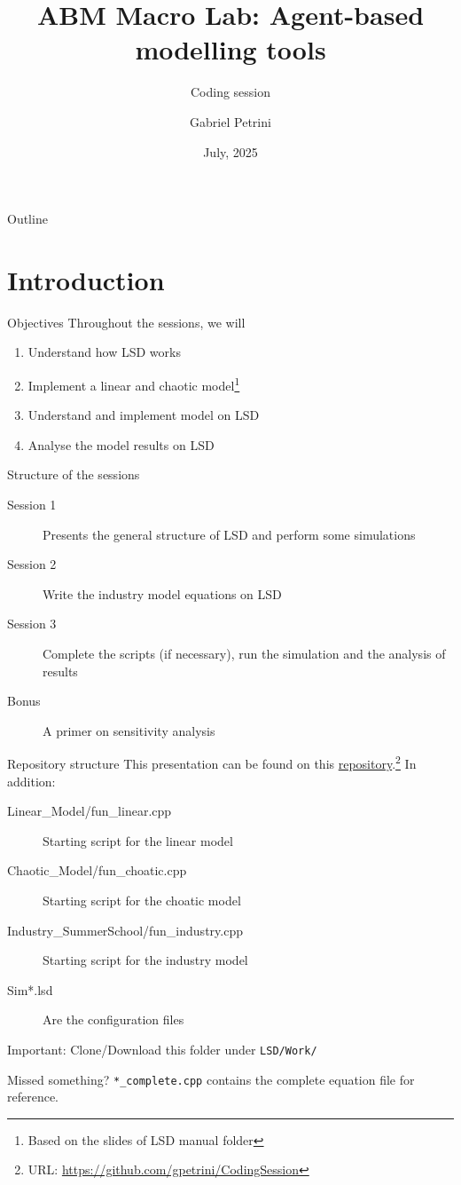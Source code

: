 \documentclass[bigger,aspectratio=169]{beamer}
\author{Gabriel Petrini}
\date{July, 2025}
\title{ABM Macro Lab: Agent-based modelling tools}
\subtitle{Coding session}
\begin{document}
\maketitle
\begin{frame}{Outline}
\tableofcontents
\end{frame}

\section{Introduction}
\label{sec:org9fabd29}

\begin{frame}[label={sec:org4c89f42}]{Objectives}
Throughout the sessions, we will

\begin{enumerate}
\item Understand how LSD works
\item Implement a linear and chaotic model\footnote{Based on the slides of LSD manual folder}
\item Understand and implement \textcite{dosi_2017_footprint} model on LSD
\item Analyse the model results on LSD
\end{enumerate}
\end{frame}
\begin{frame}[label={sec:org060ec78}]{Structure of the sessions}
\begin{description}
\item[{Session 1}] Presents the general structure of LSD and perform some simulations
\item[{Session 2}] Write the industry model equations on LSD
\item[{Session 3}] Complete the scripts (if necessary), run the simulation and the analysis of results
\item[{Bonus}] A primer on sensitivity analysis
\end{description}
\end{frame}
\begin{frame}[label={sec:org0d42a0f},fragile]{Repository structure}
 This presentation can be found on this \href{https://github.com/gpetrini/CodingSession}{repository}.\footnote{URL: \url{https://github.com/gpetrini/CodingSession}} In addition:

\begin{description}
\item[{Linear\_Model/fun\_linear.cpp}] Starting script for the linear model
\item[{Chaotic\_Model/fun\_choatic.cpp}] Starting script for the choatic model
\item[{Industry\_SummerSchool/fun\_industry.cpp}] Starting script for the industry model
\item[{Sim*.lsd}] Are the configuration files
\end{description}

\alert{Important:} Clone/Download this folder under \texttt{LSD/Work/}
\begin{block}{Missed something?}
\texttt{*\_complete.cpp} contains the complete equation file for reference.
\end{block}
\end{frame}
\end{document}
